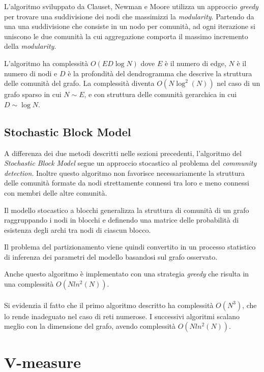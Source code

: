 \documentclass[12pt,a4paper,twoside]{report}
\begin{document}
L'algoritmo sviluppato da Clauset, Newman e Moore utilizza un approccio \textit{greedy} per trovare
una suddivisione dei nodi che massimizzi la \textit{modularity}. Partendo da una una suddivisione
che consiste in un nodo per comunità, ad ogni iterazione si uniscono le due comunità la cui
aggregazione comporta il massimo incremento della \textit{modularity}.

L'algoritmo ha complessità $O(ED\log N)$ dove $E$ è il numero di edge, $N$ è il numero di nodi e $D$
è la profondità del dendrogramma che descrive la struttura delle comunità del grafo. La complessità
diventa $O(N\log^{2}(N))$ nel caso di un grafo sparso in cui $N\sim E$, e con struttura delle
comunità gerarchica in cui $D\sim\log N$.

\subsection{Stochastic Block Model} \label{subsec:bn}

A differenza dei due metodi descritti nelle sezioni precedenti, l'algoritmo del \textit{Stochastic
Block Model} segue un approccio stocastico al problema del \textit{community detection}. Inoltre
questo algoritmo non favorisce necessariamente la struttura delle comunità formate da nodi
strettamente connessi tra loro e meno connessi con membri delle altre comunità.

Il modello stocastico a blocchi generalizza la struttura di comunità di un grafo raggruppando i nodi
in blocchi e definendo una matrice delle probabilità di esistenza degli archi tra nodi di ciascun
blocco.

Il problema del partizionamento viene quindi convertito in un processo statistico di inferenza dei
parametri del modello basandosi sul grafo osservato.

Anche questo algoritmo è implementato con una strategia \textit{greedy} che risulta in una
complessità $O(N ln^2(N))$.
\\
\\
Si evidenzia il fatto che il primo algoritmo descritto ha complessità $O(N^3)$, che lo rende
inadeguato nel caso di reti numerose. I successivi algoritmi scalano meglio con la dimensione del
grafo, avendo complessità $O(N ln^2(N))$.

\section{V-measure} \label{sec:vmeasure}
\end{document}
